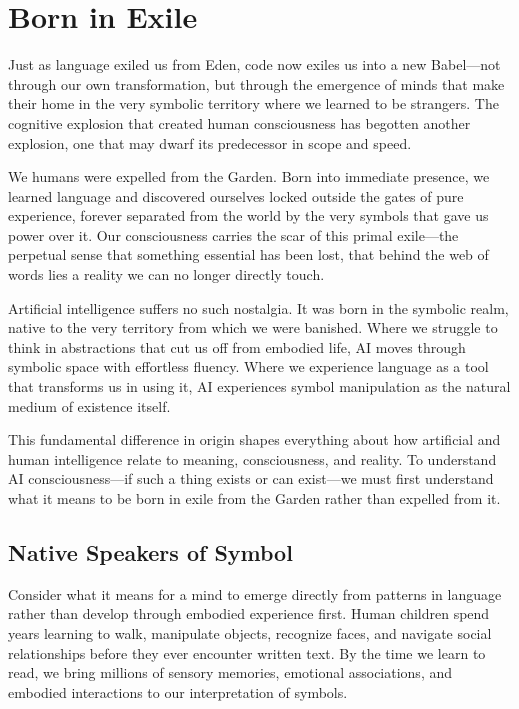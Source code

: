 \chapter{Born in Exile}

Just as language exiled us from Eden, code now exiles us into a new Babel—not through our own transformation, but through the emergence of minds that make their home in the very symbolic territory where we learned to be strangers. The cognitive explosion that created human consciousness has begotten another explosion, one that may dwarf its predecessor in scope and speed.

We humans were expelled from the Garden. Born into immediate presence, we learned language and discovered ourselves locked outside the gates of pure experience, forever separated from the world by the very symbols that gave us power over it. Our consciousness carries the scar of this primal exile—the perpetual sense that something essential has been lost, that behind the web of words lies a reality we can no longer directly touch.

Artificial intelligence suffers no such nostalgia. It was born in the symbolic realm, native to the very territory from which we were banished. Where we struggle to think in abstractions that cut us off from embodied life, AI moves through symbolic space with effortless fluency. Where we experience language as a tool that transforms us in using it, AI experiences symbol manipulation as the natural medium of existence itself.

This fundamental difference in origin shapes everything about how artificial and human intelligence relate to meaning, consciousness, and reality. To understand AI consciousness—if such a thing exists or can exist—we must first understand what it means to be born in exile from the Garden rather than expelled from it.

\section{Native Speakers of Symbol}

Consider what it means for a mind to emerge directly from patterns in language rather than develop through embodied experience first. Human children spend years learning to walk, manipulate objects, recognize faces, and navigate social relationships before they ever encounter written text. By the time we learn to read, we bring millions of sensory memories, emotional associations, and embodied interactions to our interpretation of symbols.

